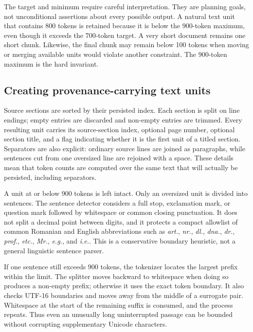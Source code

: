 The target and minimum require careful interpretation. They are planning goals,
not unconditional assertions about every possible output. A natural text unit
that contains 800 tokens is retained because it is below the 900-token maximum,
even though it exceeds the 700-token target. A very short document remains one
short chunk. Likewise, the final chunk may remain below 100 tokens when moving
or merging available units would violate another constraint. The 900-token
maximum is the hard invariant.

\subsection{Creating provenance-carrying text units}

Source sections are sorted by their persisted index. Each section is split on
line endings; empty entries are discarded and non-empty entries are trimmed.
Every resulting unit carries its source-section index, optional page number,
optional section title, and a flag indicating whether it is the first unit of a
titled section. Separators are also explicit: ordinary source lines are joined
as paragraphs, while sentences cut from one oversized line are rejoined with a
space. These details mean that token counts are computed over the same text that
will actually be persisted, including separators.

A unit at or below 900 tokens is left intact. Only an oversized unit is divided
into sentences. The sentence detector considers a full stop, exclamation mark,
or question mark followed by whitespace or common closing punctuation. It does
not split a decimal point between digits, and it protects a compact allowlist of
common Romanian and English abbreviations such as \emph{art.}, \emph{nr.},
\emph{dl.}, \emph{dna.}, \emph{dr.}, \emph{prof.}, \emph{etc.}, \emph{Mr.},
\emph{e.g.}, and \emph{i.e.}. This is a conservative boundary heuristic, not a
general linguistic sentence parser.

If one sentence still exceeds 900 tokens, the tokenizer locates the largest
prefix within the limit. The splitter moves backward to whitespace when doing
so produces a non-empty prefix; otherwise it uses the exact token boundary. It
also checks UTF-16 boundaries and moves away from the middle of a surrogate
pair. Whitespace at the start of the remaining suffix is consumed, and the
process repeats. Thus even an unusually long uninterrupted passage can be
bounded without corrupting supplementary Unicode characters.

